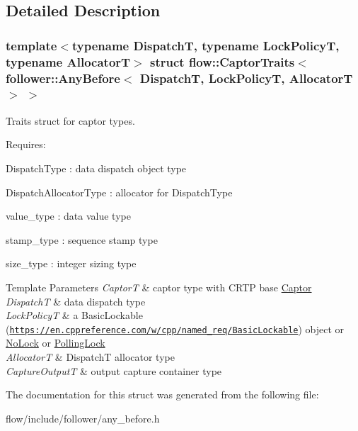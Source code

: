 \subsection{Detailed Description}
\subsubsection*{template$<$typename DispatchT, typename Lock\+PolicyT, typename AllocatorT$>$\newline
struct flow\+::\+Captor\+Traits$<$ follower\+::\+Any\+Before$<$ Dispatch\+T, Lock\+Policy\+T, Allocator\+T $>$ $>$}

Traits struct for captor types. 

Requires\+:
\begin{DoxyItemize}
\item {\ttfamily Dispatch\+Type} \+: data dispatch object type
\item {\ttfamily Dispatch\+Allocator\+Type} \+: allocator for {\ttfamily Dispatch\+Type}
\item {\ttfamily value\+\_\+type} \+: data value type
\item {\ttfamily stamp\+\_\+type} \+: sequence stamp type
\item {\ttfamily size\+\_\+type} \+: integer sizing type
\end{DoxyItemize}


\begin{DoxyTemplParams}{Template Parameters}
{\em CaptorT} & captor type with C\+R\+TP base {\ttfamily \hyperlink{classflow_1_1_captor}{Captor}}\\
\hline
{\em DispatchT} & data dispatch type \\
\hline
{\em Lock\+PolicyT} & a Basic\+Lockable (\href{https://en.cppreference.com/w/cpp/named_req/BasicLockable}{\tt https\+://en.\+cppreference.\+com/w/cpp/named\+\_\+req/\+Basic\+Lockable}) object or \hyperlink{structflow_1_1_no_lock}{No\+Lock} or \hyperlink{structflow_1_1_polling_lock}{Polling\+Lock} \\
\hline
{\em AllocatorT} & {\ttfamily DispatchT} allocator type \\
\hline
{\em Capture\+OutputT} & output capture container type \\
\hline
\end{DoxyTemplParams}


The documentation for this struct was generated from the following file\+:\begin{DoxyCompactItemize}
\item 
flow/include/follower/any\+\_\+before.\+h\end{DoxyCompactItemize}
